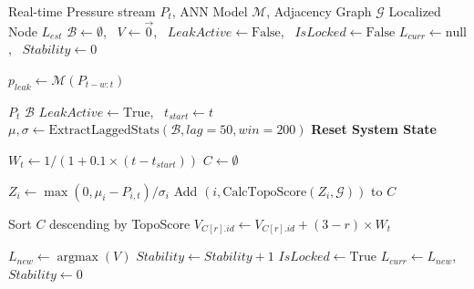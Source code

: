 \documentclass[final,5p,times,twocolumn,authoryear]{elsarticle}
\begin{document}
\begin{algorithm}[H]
\caption{Real-Time Physics-Aware Localization Strategy}
\label{alg:leak_localization}
\begin{algorithmic}[1]
\Require Real-time Pressure stream $P_t$, ANN Model $\mathcal{M}$, Adjacency Graph $\mathcal{G}$
\Ensure Localized Node $L_{est}$
\State $\mathcal{B} \leftarrow \emptyset$, \ $V \leftarrow \vec{0}$, \ $LeakActive \leftarrow \text{False}$, \ $IsLocked \leftarrow \text{False}$
\State $L_{curr} \leftarrow \text{null}$, \ $Stability \leftarrow 0$

    \State $p_{leak} \leftarrow \mathcal{M}(P_{t-w:t})$
   
          $P_t$  $\mathcal{B}$ \EndIf
            \State $LeakActive \leftarrow \text{True}$, \ $t_{start} \leftarrow t$
            \State $\mu, \sigma \leftarrow \text{ExtractLaggedStats}(\mathcal{B}, lag=50, win=200)$
        \EndIf
    \Else
         \textbf{Reset System State} \EndIf
       
            \State $W_t \leftarrow 1 / (1 + 0.1 \times (t - t_{start}))$
            \State $C \leftarrow \emptyset$ 
           
                \State $Z_i \leftarrow \max(0, \mu_i - P_{i,t}) / \sigma_i$
                    \State Add $(i, \text{CalcTopoScore}(Z_i, \mathcal{G}))$ to $C$
                \EndIf
            \EndFor
           
            \State Sort $C$ descending by TopoScore
                \State $V_{C[r].id} \leftarrow V_{C[r].id} + (3 - r) \times W_t$
            \EndFor
           
            \State $L_{new} \leftarrow \operatorname*{argmax}(V)$
                \State $Stability \leftarrow Stability + 1$
                 $IsLocked \leftarrow \text{True}$ \EndIf
            \Else
                \State $L_{curr} \leftarrow L_{new}$, \ $Stability \leftarrow 0$
            \EndIf
        \EndIf
    \EndIf
\EndWhile
\end{algorithmic}
\end{algorithm}
\end{document}
